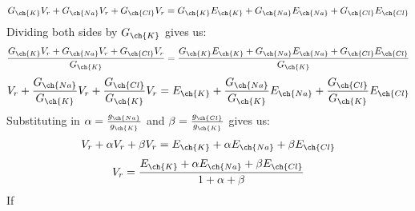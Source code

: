 \documentclass[11pt]{article}
\begin{document}
\begin{enumerate}[label=\arabic*.]
\begin{enumerate}[label=(\alph*)]
\begin{align*}
G_{\ch{K}} V_r + G_{\ch{Na}} V_r + G_{\ch{Cl}} V_r = G_{\ch{K}} E_{\ch{K}} + G_{\ch{Na}} E_{\ch{Na}} + G_{\ch{Cl}} E_{\ch{Cl}}
\end{align*}
Dividing both sides by $G_{\ch{K}}$ gives us:
\begin{align*}
\frac{G_{\ch{K}} V_r + G_{\ch{Na}} V_r + G_{\ch{Cl}} V_r} {G_{\ch{K}}} = \frac {G_{\ch{K}} E_{\ch{K}} + G_{\ch{Na}} E_{\ch{Na}} + G_{\ch{Cl}} E_{\ch{Cl}}} {G_{\ch{K}}}
\end{align*}
\begin{align*}
V_r + \frac{G_{\ch{Na}}} {G_{\ch{K}}} V_r + \frac{G_{\ch{Cl}}} {G_{\ch{K}}} V_r = E_{\ch{K}} + \frac{G_{\ch{Na}}} {G_{\ch{K}}} E_{\ch{Na}} + \frac{G_{\ch{Cl}}} {G_{\ch{K}}} E_{\ch{Cl}}
\end{align*}
Substituting in $\alpha = \frac{g_{\ch{Na}}} {g_{\ch{K}}}$ and $\beta = \frac {g_{\ch{Cl}}} {g_{\ch{K}}}$ gives us:
\begin{align*}
V_r + \alpha V_r + \beta V_r = E_{\ch{K}} + \alpha E_{\ch{Na}} + \beta E_{\ch{Cl}}
\end{align*}
\begin{align*}
V_r = \frac{E_{\ch{K}} + \alpha E_{\ch{Na}} + \beta E_{\ch{Cl}}} {1 + \alpha + \beta}
\end{align*}
If 











\end{enumerate}
\end{enumerate}
\end{document}
